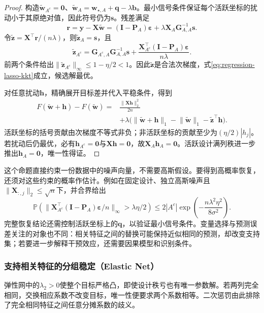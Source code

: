 \begin{proof}
构造$\widetilde{\bm{w}}_{A^c}=\bm{0}$、$\widetilde{\bm{w}}_A=\bm{w}_{\star,A}+\bm{q}-\lambda\bm{b}$。最小信号条件保证每个活跃坐标的扰动小于其原绝对值，因此符号仍为$\bm{s}$。残差满足
\[
  \bm{r}=\bm{y}-\bm{X}\widetilde{\bm{w}}
  =(\bm{I}-\bm{P}_A)\bm{\varepsilon}
   +\lambda\bm{X}_A\bm{G}_{A,A}^{-1}\bm{s}.
\]
令$\widetilde{\bm{z}}=\bm{X}^{\top}\bm{r}/(n\lambda)$，则$\widetilde{\bm{z}}_A=\bm{s}$，且
\[
  \widetilde{\bm{z}}_{A^c}
  =\bm{G}_{A^c,A}\bm{G}_{A,A}^{-1}\bm{s}
    +\frac{\bm{X}_{A^c}^{\top}(\bm{I}-\bm{P}_A)
            \bm{\varepsilon}}{n\lambda}.
\]
前两个条件给出$\lVert\widetilde{\bm{z}}_{A^c}\rVert_\infty\leq1-\eta/2<1$。因此$\widetilde{\bm{z}}$是合法次梯度，式\eqref{eq:regression-lasso-kkt}成立，候选解最优。

对任意扰动$\bm{h}$，精确展开目标差并代入平稳条件，得到
\[
  \begin{aligned}
    F(\widetilde{\bm{w}}+\bm{h})-F(\widetilde{\bm{w}})
    ={}&\frac{\lVert\bm{X}\bm{h}\rVert_2^2}{2n}\\
      &+\lambda\bigl(\lVert\widetilde{\bm{w}}+\bm{h}\rVert_1
         -\lVert\widetilde{\bm{w}}\rVert_1
         -\widetilde{\bm{z}}^{\top}\bm{h}\bigr).
  \end{aligned}
\]
活跃坐标的括号贡献由次梯度不等式非负；非活跃坐标的贡献至少为$(\eta/2)|h_j|$。若扰动后仍最优，必有$\bm{h}_{A^c}=\bm{0}$与$\bm{X}\bm{h}=\bm{0}$，故$\bm{X}_A\bm{h}_A=\bm{0}$。活跃设计满列秩进一步推出$\bm{h}_A=\bm{0}$，唯一性得证。
\end{proof}

这个命题直接约束一份数据中的噪声向量，不需要高斯假设。要得到高概率恢复，还须对这些约束的概率作估计。例如在固定设计、独立高斯噪声且$\lVert\bm{X}_{:,j}\rVert_2\leq\sqrt n$下，并合界给出
\[
  \mathbb{P}\!\left(
    \lVert\bm{X}_{A^c}^{\top}(\bm{I}-\bm{P}_A)
       \bm{\varepsilon}/n\rVert_\infty>\lambda\eta/2
  \right)
  \leq2|A^c|\exp\!\left(-\frac{n\lambda^2\eta^2}{8\sigma^2}\right).
\]
完整恢复结论还需控制活跃坐标上的$\bm{q}$，以验证最小信号条件。变量选择与预测误差关注的对象也不同：相关特征之间的替换可能保持近似相同的预测，却改变支持集；若要进一步解释干预效应，还需要因果模型和识别条件。

\subsubsection{支持相关特征的分组稳定（Elastic Net）}
\label{sec:regression-elastic-net}

弹性网中的$\lambda_2>0$使整个目标严格凸，即使设计秩亏也有唯一参数解。若两列完全相同，交换相应系数不改变目标，唯一性便要求两个系数相等。二次惩罚由此排除了完全相同特征之间任意分摊系数的歧义。

